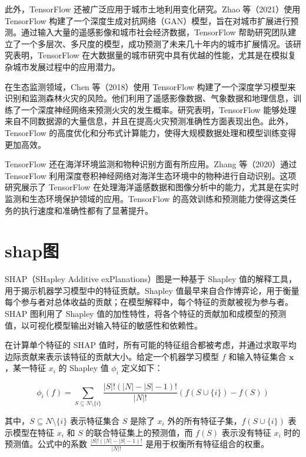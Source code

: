 \documentclass[AutoFakeBold]{LZUThesis-PgD&PhD}
\begin{document}
	此外，TensorFlow 还被广泛应用于城市土地利用变化研究。Zhao 等（2021）使用 TensorFlow 构建了一个深度生成对抗网络（GAN）模型，旨在对城市扩展进行预测\cite{zhao2021}。通过输入大量的遥感影像和城市社会经济数据，TensorFlow 帮助研究团队建立了一个多层次、多尺度的模型，成功预测了未来几十年内的城市扩展情况。该研究表明，TensorFlow 在大数据量的城市研究中具有优越的性能，尤其是在模拟复杂城市发展过程中的应用潜力。
	
	在生态监测领域，Chen 等（2018）使用 TensorFlow 构建了一个深度学习模型来识别和监测森林火灾的风险\cite{chen2018}。他们利用了遥感影像数据、气象数据和地理信息，训练了一个深度神经网络来预测火灾的发生概率。研究表明，TensorFlow 能够处理来自不同数据源的大量信息，并且在提高火灾预测准确性方面表现出色。此外，TensorFlow 的高度优化和分布式计算能力，使得大规模数据处理和模型训练变得更加高效。
	
	TensorFlow 还在海洋环境监测和物种识别方面有所应用。Zhang 等（2020）通过 TensorFlow 利用深度卷积神经网络对海洋生态环境中的物种进行自动识别\cite{zhang2020}。这项研究展示了 TensorFlow 在处理海洋遥感数据和图像分析中的能力，尤其是在实时监测和生态环境保护领域的应用。TensorFlow 的高效训练和预测能力使得这类任务的执行速度和准确性都有了显著提升。
	
	
	
	\section{shap图}
	
	
	
	
	SHAP（SHapley Additive exPlanations）图是一种基于 Shapley 值的解释工具，用于揭示机器学习模型中的特征贡献。Shapley 值最早来自合作博弈论，用于衡量每个参与者对总体收益的贡献；在模型解释中，每个特征的贡献被视为参与者。SHAP 图利用了 Shapley 值的加性特性，将各个特征的贡献加和成模型的预测值，以可视化模型输出对输入特征的敏感性和依赖性。
	
	在计算单个特征的 SHAP 值时，所有可能的特征组合都被考虑，并通过求取平均边际贡献来表示该特征的贡献大小。给定一个机器学习模型 \( f \) 和输入特征集合 \( \mathbf{x} \)，某一特征 \( x_i \) 的 Shapley 值 \( \phi_i \) 定义如下：
	
	\[
	\phi_i(f) = \sum_{S \subseteq N \setminus \{i\}} \frac{|S|! (|N| - |S| - 1)!}{|N|!} \left( f(S \cup \{i\}) - f(S) \right)
	\]
	
	其中，\( S \subseteq N \setminus \{i\} \) 表示特征集合 \( S \) 是除了 \( x_i \) 外的所有特征子集，\( f(S \cup \{i\}) \) 表示模型在特征 \( x_i \) 和 \( S \) 的联合特征集上的预测值，而 \( f(S) \) 表示没有特征 \( x_i \) 时的预测值。公式中的系数 \( \frac{|S|! (|N| - |S| - 1)!}{|N|!} \) 是用于权衡所有特征组合的权重。
	
\end{document}
